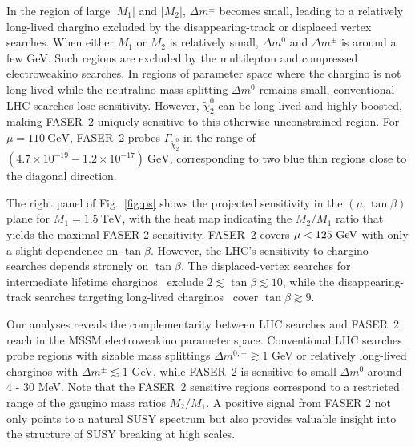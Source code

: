 \documentclass[
    twocolumn,
    superscriptaddress,
    amsmath, 
    amssymb,
    aps,
    reprint,
    floatfix
]{revtex4-2}
\newcommand{\Shufang}[1]{\textcolor{red} {SS: #1}}
\newcommand{\px}[1]{\textcolor{blue} {PX: {\bf Comment:} {\it #1}}}
\begin{document}
In the region of large $|M_1|$ and $|M_2|$, $\Delta m^\pm$ becomes small, leading to a relatively long-lived chargino  excluded by the disappearing-track or displaced vertex searches.
When either $M_1$ or $M_2$ is relatively small, $\Delta m^0$ and $\Delta m^\pm$ is around a few GeV. Such regions are excluded by the multilepton  and compressed electroweakino searches. 
In regions of parameter space where the chargino is not long-lived while the neutralino mass splitting $\Delta m^0$ remains small, conventional LHC searches lose sensitivity. However,  $\tilde\chi_2^0$  can be long-lived and highly boosted, making FASER~2 uniquely sensitive to this otherwise unconstrained region. For $\mu = 110~\mathrm{GeV}$, FASER~2 probes  $\Gamma_{\tilde{\chi}_2^0}$ in the range of $(4.7\times10^{-19} - 1.2\times10^{-17})~\mathrm{GeV}$, corresponding to two blue thin regions close to the diagonal direction.

The right panel of Fig.~\ref{fig:ps} shows the projected sensitivity in the $(\mu,\tan\beta)$ plane for $M_1=1.5~\mathrm{TeV}$, with the heat map indicating the $M_2/M_1$ ratio that yields the maximal FASER 2 sensitivity.
FASER~2 covers $\mu < 125~{\rm GeV}$ with only a slight dependence on $\tan\beta$.
However, the LHC's sensitivity to chargino searches depends strongly on $\tan\beta$. The displaced-vertex searches for intermediate lifetime charginos~\cite{ATLAS:2024umc, CMS:2025twk} exclude $2\lesssim \tan\beta \lesssim 10$, while the disappearing-track searches targeting long-lived charginos~\cite{ATLAS:2022rme, CMS:2023mny} cover $\tan\beta \gtrsim 9$. 

Our analyses reveals the complementarity between LHC searches and FASER~2 reach in the MSSM electroweakino parameter space.
Conventional LHC searches probe regions with sizable mass splittings $\Delta m^{0,\pm}\gtrsim 1$ GeV or relatively long-lived charginos with $\Delta m^\pm \lesssim 1$ GeV, while FASER~2 is sensitive to small $\Delta m^0$ around 4 - 30 MeV.
Note that the FASER~2 sensitive regions correspond to a restricted range of the gaugino mass ratios $M_2/M_1$. A positive signal from FASER 2 not only points to a natural SUSY spectrum but also provides valuable insight into the structure of SUSY breaking at high scales.
\end{document}
